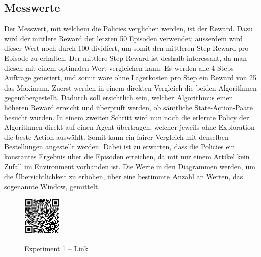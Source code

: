 \newpage
\subsection{Messwerte}
Der Messwert, mit welchem die Policies verglichen werden, ist der Reward. Dazu wird der mittlere Reward der letzten 50 Episoden verwendet; ausserdem wird dieser Wert noch durch 100 dividiert, um somit den mittleren Step-Reward pro Episode zu erhalten. Der mittlere Step-Reward ist deshalb interessant, da man diesen mit einem optimalen Wert vergleichen kann. Es werden alle 4 Steps Aufträge generiert, und somit wäre ohne Lagerkosten pro Step ein Reward von 25 das Maximum.
Zuerst werden in einem direkten Vergleich die beiden Algorithmen gegenübergestellt. Dadurch soll ersichtlich sein, welcher Algorithmus einen höheren Reward erreicht und überprüft werden, ob sämtliche State-Action-Paare besucht wurden.
In einem zweiten Schritt wird nun noch die erlernte Policy der Algorithmen direkt auf einen Agent übertragen, welcher jeweils ohne Exploration die beste Action auswählt. Somit kann ein fairer Vergleich mit denselben Bestellungen angestellt werden. Dabei ist zu erwarten, dass die Policies ein konstantes Ergebnis über die Episoden erreichen, da mit nur einem Artikel kein Zufall im Environment vorhanden ist.
Die Werte in den Diagrammen werden, um die Übersichtlichkeit zu erhöhen, über eine bestimmte Anzahl an Werten, das sogenannte Window, gemittelt.
\smallskip\\
\begin{figure}[hb]
  \centering
  \href{https://github.com/benji24290/rl-warehouse/tree/experiment_1}{\includegraphics[height=1.9cm]{img/qr/qrcode_exp1.jpeg}}
  \caption{Experiment 1 – Link}
\end{figure}
\newpage
